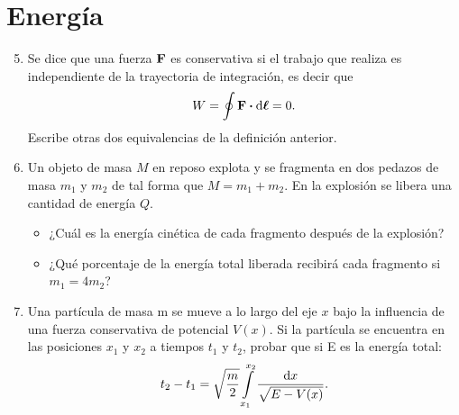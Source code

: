 \documentclass[12pt]{article}
\theoremstyle{problem}
\begin{document}
\section*{Energía}
\begin{enumerate}[label=\textbf{2.\arabic*)}]
    \setcounter{enumi}{4}
    \item Se dice que una fuerza \(\vb{F}\) es conservativa si el trabajo que realiza es independiente de la trayectoria de integración, es decir que
    \begin{equation*}
        W = \oint \vb{F}\vdot \dd{\bm{\ell}} = 0.
    \end{equation*}
    Escribe otras dos equivalencias de la definición anterior.
    \item Un objeto de masa \(M\) en reposo explota y se fragmenta en dos pedazos de masa \(m_{1}\) y \(m_{2}\) de tal forma que \(M = m_{1}+m_{2}\). En la explosión se libera una cantidad de energía \(Q\).
    \begin{itemize}[label = \textbullet]
        \item ¿Cuál es la energía cinética de cada fragmento después de la explosión?
        \item ¿Qué porcentaje de la energía total liberada recibirá cada fragmento si \(m_{1} = 4 m_{2}\)?
    \end{itemize}
    
    \item Una partícula de masa m se mueve a lo largo del eje \(x\) bajo la influencia de una fuerza conservativa de potencial \(V(x)\). Si la partícula se encuentra en las posiciones \(x_{1}\) y \(x_{2}\) a tiempos \(t_{1}\) y \(t_{2}\), probar que si E es la energía total:
    \begin{align*}
        t_{2}-t_{1}=\sqrt{\frac{m}{2}}\int\displaylimits_{x_{1}}^{x_{2}}\frac{\dd{x}}{\sqrt{E-V(x)}}.
    \end{align*}
\end{enumerate}
\end{document}
